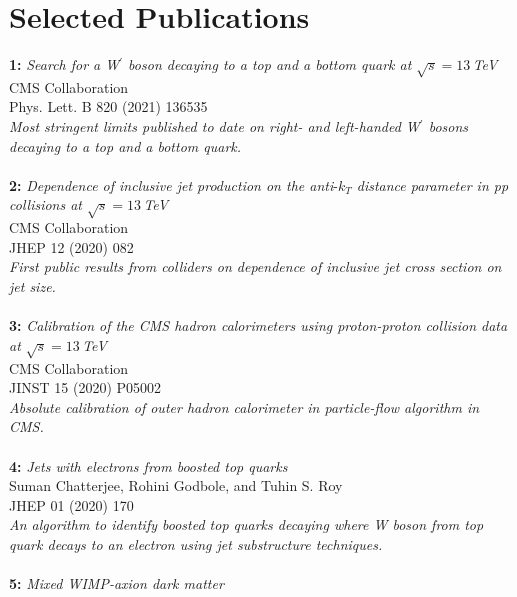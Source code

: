 \documentclass[a4paper,11pt]{article}
\begin{document}
\newpage

\section*{{Selected Publications}}

\textbf{1:} \textit{
Search for a W$^\prime$ boson decaying to a top and a bottom quark at $\sqrt{s}=13$\,TeV}\\
CMS Collaboration \\
Phys. Lett. B 820 (2021) 136535 \\
\textit{Most stringent limits published to date on right- and left-handed W$^\prime$ bosons decaying to a top and a bottom quark.}\\
\\
\textbf{2:} \textit{
Dependence of inclusive jet production on the anti$\mbox{-}k_T$ distance parameter in pp collisions at $\sqrt{s} = 13$\,TeV}\\
CMS Collaboration \\
JHEP 12 (2020) 082\\
\textit{First public results from colliders on dependence of inclusive jet cross section on jet size.}\\
\\
\textbf{3:} \textit{Calibration of the CMS hadron calorimeters using proton-proton collision data at $\sqrt{s}= 13$\,TeV}\\
CMS Collaboration \\
JINST 15 (2020) P05002\\
\textit{Absolute calibration of outer hadron calorimeter in particle-flow algorithm in CMS.}\\
\\
\textbf{4:} \textit{Jets with electrons from boosted top quarks}\\
Suman Chatterjee, Rohini Godbole, and Tuhin S. Roy\\
JHEP 01 (2020) 170\\
\textit{An algorithm to identify boosted top quarks decaying where W boson from top quark decays to an electron using jet substructure techniques.}\\
\\
\textbf{5:} \textit{Mixed WIMP-axion dark matter}\\
\end{document}
